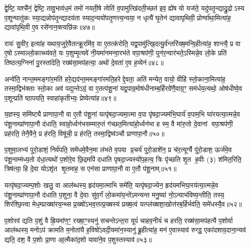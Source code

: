 द्वे॒ष्टि॒ यश्चै॑नं॒ द्वेष्टि॒ तावु॒भाव॑ध॒मं तमो॑ नयती॒षे त्वेति॑ व॒पामुत्खि॑दती॒च्छत॑ इव॒ ह्ये॑ष यो यज॑ते॒ यदु॑पतृ॒न्द्याद्रु॒द्रोऽस्य प॒शून्घातु॑कः स्या॒द्यन्नोप॑तृ॒न्द्यादय॑ता स्याद॒न्ययो॑पतृ॒णत्त्य॒न्यया॒ न धृत्यै॑ घृ॒तेन॑ द्यावापृथिवी॒ प्रोर्ण्वा॑था॒मित्या॑ह॒ द्यावा॑पृथि॒वी ए॒व रसे॑नान॒क्त्यछि॑न्नः॥४७॥

रायः॑ सु॒वीर॒ इत्या॑ह यथाय॒जुरे॒वैतत्क्रू॒रमि॑व॒ वा ए॒तत्क॑रोति॒ यद्व॒पामु॑त्खि॒दत्यु॒र्व॑न्तरि॑ख्ष॒मन्वि॒हीत्या॑ह॒ शान्त्यै॒ प्र वा ए॒षोऽस्माल्लो॒काच्च्य॑वते॒ यः प॒शुम्मृ॒त्यवे॑ नी॒यमा॑नमन्वा॒रभ॑ते वपा॒श्रप॑णी॒ पुन॑र॒न्वार॑भते॒ऽस्मिन्ने॒व लो॒के प्रति॑ तिष्ठत्य॒ग्निना॑ पु॒रस्ता॑देति॒ रख्ष॑सा॒मप॑हत्या॒ अथो॑ दे॒वता॑ ए॒व ह॒व्येन॑॥४८॥

अन्वे॑ति॒ नान्त॒ममङ्गा॑र॒मति॑ हरे॒द्यद॑न्त॒ममङ्गा॑रमति॒हरेद्दे॒वता॒ अति॑ मन्येत॒ वायो॒ वीहि॑ स्तो॒काना॒मित्या॑ह॒ तस्मा॒द्विभ॑क्ताः स्तो॒का अव॑ पद्य॒न्तेऽग्रं॒ वा ए॒तत्प॑शू॒नां यद्व॒पाग्र॒मोष॑धीनाम्ब॒र्\mbox{}हिरग्रे॑णै॒वाग्र॒ꣳ॒ सम॑र्धय॒त्यथो॒ ओष॑धीष्वे॒व प॒शून्प्रति॑ ष्ठापयति॒ स्वाहा॑कृतीभ्यः॒ प्रेष्येत्या॑ह॥४९॥

य॒ज्ञस्य॒ समि॑ष्ट्यै प्राणापा॒नौ वा ए॒तौ प॑शू॒नां यत्पृ॑षदा॒ज्यमा॒त्मा व॒पा पृ॑षदा॒ज्यम॑भि॒घार्य॑ व॒पाम॒भि घा॑रयत्या॒त्मन्ने॒व प॑शू॒नाम्प्रा॑णापा॒नौ द॑धाति॒ स्वाहो॒र्ध्वन॑भसम्मारु॒तं ग॑च्छत॒मित्या॑हो॒र्ध्वन॑भा ह स्म॒ वै मा॑रु॒तो दे॒वानां वपा॒श्रप॑णी॒ प्रह॑रति॒ तेनै॒वैने॒ प्र ह॑रति॒ विषू॑ची॒ प्र ह॑रति॒ तस्मा॒द्विष्व॑ञ्चौ प्राणापा॒नौ॥५०॥

{\anuvakamend[{स्वधि॑तिश्चै॒वाच्छि॑न्नो ह॒व्येने॒ष्येत्या॑ह॒ षट्च॑त्वारिशच्च॥९॥}]}

प॒शुमा॒लभ्य॑ पुरो॒डाशं॒ निर्व॑पति॒ समे॑धमे॒वैन॒मा ल॑भते व॒पया प्र॒चर्य॑ पुरो॒डाशे॑न॒ प्र च॑र॒त्यूर्ग्वै पु॑रो॒डाश॒ ऊर्ज॑मे॒व प॑शू॒नाम्म॑ध्य॒तो द॑धा॒त्यथो॑ प॒शोरे॒व छि॒द्रमपि॑ दधाति पृषदा॒ज्यस्यो॑प॒हत्य॒ त्रिः पृ॑च्छति शृ॒त ह॒वीः (३) श॑मित॒रिति॒ त्रिष॑त्या॒ हि दे॒वा योऽशृ॑त शृ॒तमाह॒ स एन॑सा प्राणापा॒नौ वा ए॒तौ प॑शू॒नाम्॥५१॥

यत्पृ॑षदा॒ज्यम्प॒शोः खलु॒ वा आल॑ब्धस्य॒ हृद॑यमा॒त्माभि समे॑ति॒ यत्पृ॑षदा॒ज्येन॒ हृद॑यमभिघा॒रय॑त्या॒त्मन्ने॒व प॑शू॒नाम्प्रा॑णापा॒नौ द॑धाति प॒शुना॒ वै दे॒वाः सु॑व॒र्गं लो॒कमा॑य॒न्ते॑ऽमन्यन्त मनु॒ष्या॑ नो॒ऽन्वाभ॑विष्य॒न्तीति॒ तस्य॒ शिर॑श्छि॒त्त्वा मेध॒म्प्राख्षा॑रय॒न्थ्स प्र॒ख्षो॑ऽभव॒त्तत्प्र॒ख्षस्य॑ प्रख्ष॒त्वं यत्प्ल॑ख्षशा॒खोत्त॑रब॒र्\mbox{}हिर्भव॑ति॒ समे॑धस्यै॒व॥५२॥

प॒शोरव॑ द्यति प॒शुं वै ह्रि॒यमा॑ण॒ꣳ॒ रख्षा॒ꣳ॒स्यनु॑ सचन्तेऽन्त॒रा यूपं॑ चाहव॒नीयं॑ च हरति॒ रख्ष॑सा॒मप॑हत्यै प॒शोर्वा आल॑ब्धस्य॒ मनोऽप॑ क्रामति म॒नोता॑यै ह॒विषो॑ऽवदी॒यमा॑न॒स्यानु॑ ब्रू॒हीत्या॑ह॒ मन॑ ए॒वास्याव॑ रुन्द्ध॒ एका॑दशाव॒दाना॒न्यव॑ द्यति॒ दश॒ वै प॒शोः प्रा॒णा आ॒त्मैका॑द॒शो यावा॑ने॒व प॒शुस्तस्याव॑॥५३॥


